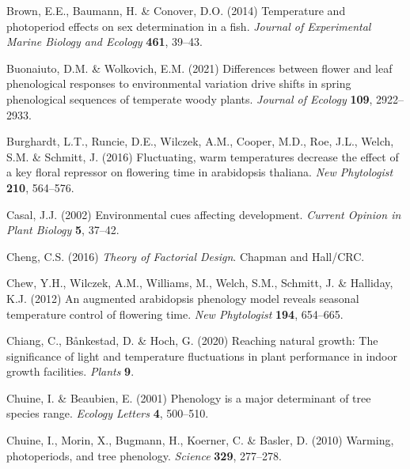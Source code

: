 \documentclass[11pt]{article}
\begin{document}
\begin{thebibliography}{49}
Brown, E.E., Baumann, H. \& Conover, D.O. (2014) Temperature and photoperiod
  effects on sex determination in a fish. \emph{Journal of Experimental Marine
  Biology and Ecology} \textbf{461}, 39--43.

Buonaiuto, D.M. \& Wolkovich, E.M. (2021) Differences between flower and leaf
  phenological responses to environmental variation drive shifts in spring
  phenological sequences of temperate woody plants. \emph{Journal of Ecology}
  \textbf{109}, 2922--2933.

Burghardt, L.T., Runcie, D.E., Wilczek, A.M., Cooper, M.D., Roe, J.L., Welch,
  S.M. \& Schmitt, J. (2016) Fluctuating, warm temperatures decrease the effect
  of a key floral repressor on flowering time in arabidopsis thaliana.
  \emph{New Phytologist} \textbf{210}, 564--576.

Casal, J.J. (2002) Environmental cues affecting development. \emph{Current
  Opinion in Plant Biology} \textbf{5}, 37--42.

Cheng, C.S. (2016) \emph{Theory of Factorial Design}. Chapman and Hall/CRC.

Chew, Y.H., Wilczek, A.M., Williams, M., Welch, S.M., Schmitt, J. \& Halliday,
  K.J. (2012) An augmented arabidopsis phenology model reveals seasonal
  temperature control of flowering time. \emph{New Phytologist} \textbf{194},
  654--665.

Chiang, C., B{\aa}nkestad, D. \& Hoch, G. (2020) Reaching natural growth: The
  significance of light and temperature fluctuations in plant performance in
  indoor growth facilities. \emph{Plants} \textbf{9}.

Chuine, I. \& Beaubien, E. ({2001}) {Phenology is a major determinant of tree
  species range}. \emph{Ecology Letters} \textbf{{4}}, {500--510}.

Chuine, I., Morin, X., Bugmann, H., Koerner, C. \& Basler, D. (2010) Warming,
  photoperiods, and tree phenology. \emph{Science} \textbf{329}, 277--278.


\end{thebibliography}
\end{document}
